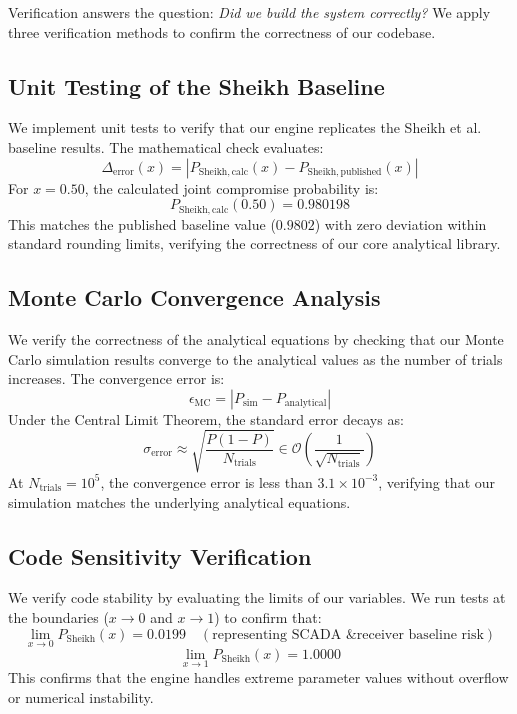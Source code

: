 \documentclass[12pt, oneside, a4paper]{report}
\theoremstyle{definition}
\theoremstyle{remark}
\begin{document}
Verification answers the question: \emph{Did we build the system correctly?} We apply three verification methods to confirm the correctness of our codebase.

\subsection{Unit Testing of the Sheikh Baseline}
We implement unit tests to verify that our engine replicates the Sheikh et al. \cite{sheikh2020} baseline results. The mathematical check evaluates:
\begin{equation}
\Delta_{\mathrm{error}}(x) = | P_{\mathrm{Sheikh,calc}}(x) - P_{\mathrm{Sheikh,published}}(x) |
\end{equation}
For $x = 0.50$, the calculated joint compromise probability is:
\begin{equation}
P_{\mathrm{Sheikh,calc}}(0.50) = 0.980198
\end{equation}
This matches the published baseline value ($0.9802$) with zero deviation within standard rounding limits, verifying the correctness of our core analytical library.

\subsection{Monte Carlo Convergence Analysis}
We verify the correctness of the analytical equations by checking that our Monte Carlo simulation results converge to the analytical values as the number of trials increases. The convergence error is:
\begin{equation}
\epsilon_{\mathrm{MC}} = | P_{\mathrm{sim}} - P_{\mathrm{analytical}} |
\end{equation}
Under the Central Limit Theorem, the standard error decays as:
\begin{equation}
\sigma_{\mathrm{error}} \approx \sqrt{\frac{P(1-P)}{N_{\mathrm{trials}}}} \in \mathcal{O}\left(\frac{1}{\sqrt{N_{\mathrm{trials}}}}\right)
\end{equation}
At $N_{\mathrm{trials}} = 10^5$, the convergence error is less than $3.1 \times 10^{-3}$, verifying that our simulation matches the underlying analytical equations.

\subsection{Code Sensitivity Verification}
We verify code stability by evaluating the limits of our variables. We run tests at the boundaries ($x \to 0$ and $x \to 1$) to confirm that:
\begin{equation}
\lim_{x \to 0} P_{\mathrm{Sheikh}}(x) = 0.0199 \quad (\text{representing SCADA \& receiver baseline risk})
\end{equation}
\begin{equation}
\lim_{x \to 1} P_{\mathrm{Sheikh}}(x) = 1.0000
\end{equation}
This confirms that the engine handles extreme parameter values without overflow or numerical instability.
\end{document}
